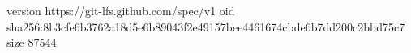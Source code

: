 version https://git-lfs.github.com/spec/v1
oid sha256:8b3cfe6b3762a18d5e6b89043f2e49157bee4461674cbde6b7dd200c2bbd75c7
size 87544
